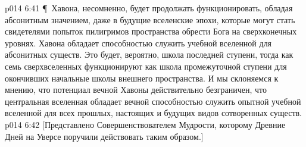 \vs p014 6:41 \P\ Хавона, несомненно, будет продолжать функционировать, обладая абсонитным значением, даже в будущие вселенские эпохи, которые могут стать свидетелями попыток пилигримов пространства обрести Бога на сверхконечных уровнях. Хавона обладает способностью служить учебной вселенной для абсонитных существ. Это будет, вероятно, школа последней ступени, тогда как семь сверхвселенных функционируют как школа промежуточной ступени для окончивших начальные школы внешнего пространства. И мы склоняемся к мнению, что потенциал вечной Хавоны действительно безграничен, что центральная вселенная обладает вечной способностью служить опытной учебной вселенной для всех прошлых, настоящих и будущих видов сотворенных существ.
\vs p014 6:42 [Представлено Совершенствователем Мудрости, которому Древние Дней на Уверсе поручили действовать таким образом.]
